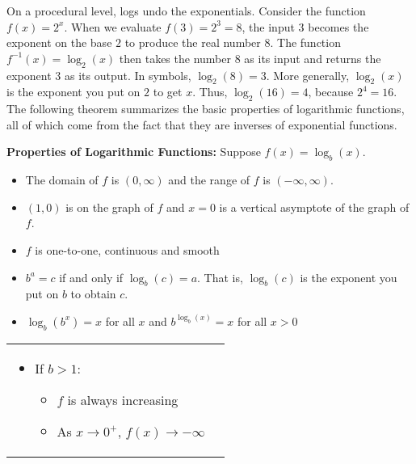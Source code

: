 On a procedural level, logs undo the exponentials.  Consider the function $f(x) = 2^{x}$.  When we evaluate $f(3) = 2^{3} = 8$, the input $3$ becomes the exponent on the base $2$ to produce the real number $8$.  The function $f^{-1}(x) = \log_{2}(x)$ then takes the number $8$ as its input and returns the exponent $3$ as its output.  In symbols, $\log_{2}(8) = 3$. More generally, $\log_{2}(x)$ is the exponent you put on $2$ to get $x$.  Thus, $\log_{2}(16) = 4$, because $2^{4} = 16$.  The following theorem summarizes the basic properties of logarithmic functions, all of which come from the fact that they are inverses of exponential functions. 
\smallskip

\colorbox{ResultColor}{\bbm

\begin{thm} \label{logfcnprops} \textbf{Properties of Logarithmic Functions:} Suppose $f(x) = \log_{b}(x)$. 

\begin{itemize}

\item  The domain of $f$ is $(0, \infty)$ and the range of $f$ is $(-\infty, \infty)$.

\item  $(1,0)$ is on the graph of $f$ and $x=0$ is a vertical asymptote of the graph of $f$.

\item  $f$ is one-to-one, continuous and smooth

\item  $b^{a} = c$ if and only if $\log_{b}(c) = a$.  That is, $\log_{b}(c)$ is the exponent you put on $b$ to obtain $c$.

\item  $\log_{b} \left(b^{x}\right) = x$ for all $x$ and $b^{\log_{b}(x)} = x$ for all $x > 0$

\end{itemize}

\begin{tabular}{m{2.5in}m{2.5in}}

\begin{itemize}

\item  If $b > 1$:

\begin{itemize}

\item  $f$ is always increasing

\item  As $x \rightarrow 0^{+}$, $f(x) \rightarrow -\infty$


\end{itemize}
\end{itemize}
\end{tabular}
\end{thm}}
